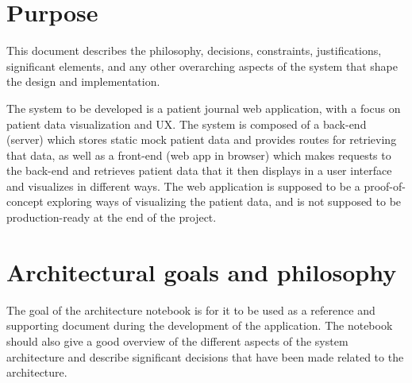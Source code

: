 \documentclass[10pt,a4paper]{article}
\begin{document}
\clearpage



\section{Purpose}


This document describes the philosophy, decisions, constraints, justifications, significant elements, and any other overarching aspects of the system that shape the design and implementation. 

The system to be developed is a patient journal web application, with a focus on patient data visualization and UX. The system is composed of a back-end (server) which stores static mock patient data and provides routes for retrieving that data, as well as a front-end (web app in browser) which makes requests to the back-end and retrieves patient data that it then displays in a user interface and visualizes in different ways. The web application is supposed to be a proof-of-concept exploring ways of visualizing the patient data, and is not supposed to be production-ready at the end of the project.

\section{Architectural goals and philosophy}
The goal of the architecture notebook is for it to be used as a reference and supporting document during the development of the application. The notebook should also give a good overview of the different aspects of the system architecture and describe significant decisions that have been made related to the architecture. 
\end{document}
